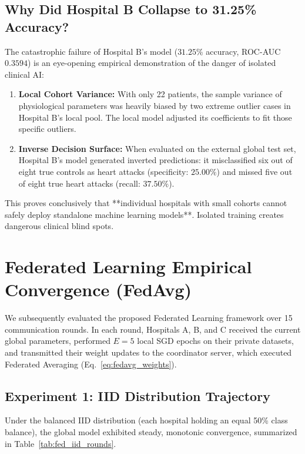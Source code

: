 \subsection{Why Did Hospital B Collapse to 31.25\% Accuracy?}
The catastrophic failure of Hospital B's model ($31.25\%$ accuracy, ROC-AUC $0.3594$) is an eye-opening empirical demonstration of the danger of isolated clinical AI:
\begin{enumerate}
    \item \textbf{Local Cohort Variance:} With only 22 patients, the sample variance of physiological parameters was heavily biased by two extreme outlier cases in Hospital B's local pool. The local model adjusted its coefficients to fit those specific outliers.
    \item \textbf{Inverse Decision Surface:} When evaluated on the external global test set, Hospital B's model generated inverted predictions: it misclassified six out of eight true controls as heart attacks (specificity: $25.00\%$) and missed five out of eight true heart attacks (recall: $37.50\%$).
\end{enumerate}

This proves conclusively that **individual hospitals with small cohorts cannot safely deploy standalone machine learning models**. Isolated training creates dangerous clinical blind spots.

\section{Federated Learning Empirical Convergence (FedAvg)}
\label{sec:federated_results}

We subsequently evaluated the proposed Federated Learning framework over 15 communication rounds. In each round, Hospitals A, B, and C received the current global parameters, performed $E=5$ local SGD epochs on their private datasets, and transmitted their weight updates to the coordinator server, which executed Federated Averaging (Eq.~\ref{eq:fedavg_weights}).

\subsection{Experiment 1: IID Distribution Trajectory}
Under the balanced IID distribution (each hospital holding an equal 50\% class balance), the global model exhibited steady, monotonic convergence, summarized in Table~\ref{tab:fed_iid_rounds}.

